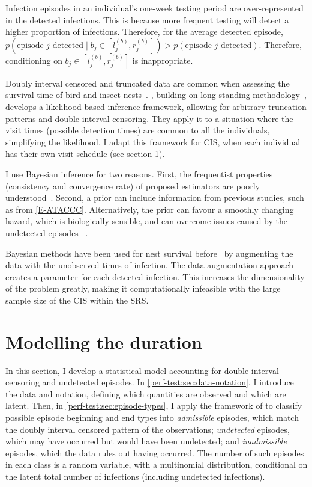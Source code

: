 \documentclass[thesis.tex]{subfiles}
\begin{document}
Infection episodes in an individual's one-week testing period are over-represented in the detected infections.
This is because more frequent testing will detect a higher proportion of infections.
Therefore, for the average detected episode, $p(\text{episode $j$ detected} \mid b_j \in [l_j^{(b)}, r_j^{(b)}]) > p(\text{episode $j$ detected})$.
Therefore, conditioning on $b_j \in [l_j^{(b)}, r_j^{(b)}]$ is inappropriate.

Doubly interval censored and truncated data are common when assessing the survival time of bird and insect nests~\autocite{heiseyABCs}.
\textcite{heiseyModelling}, building on long-standing methodology~\autocite{dempsterMaximum,turnbullEmpirical}, develops a likelihood-based inference framework, allowing for arbitrary truncation patterns and double interval censoring.
They apply it to a situation where the visit times (possible detection times) are common to all the individuals, simplifying the likelihood.
I adapt this framework for CIS, when each individual has their own visit schedule (see section \cref{perf-test:sec:model}).

I use Bayesian inference for two reasons.
First, the frequentist properties (\eg consistency and convergence rate) of proposed estimators are poorly understood~\autocite{sunAnalysis,dengNonparametric}.
Second, a prior can include information from previous studies, such as from \cref{E-ATACCC}.
Alternatively, the prior can favour a smoothly changing hazard, which is biologically sensible, and can overcome issues caused by the undetected episodes ~\autocite{caoBias}.

Bayesian methods have been used for nest survival before~\autocite{heBayesiana,heBayesian,caoModeling} by augmenting the data with the unobserved times of infection.
The data augmentation approach creates a parameter for each detected infection.
This increases the dimensionality of the problem greatly, making it computationally infeasible with the large sample size of the CIS within the SRS.


\section{Modelling the duration}\label{perf-test:sec:model}

In this section, I develop a statistical model accounting for double interval censoring and undetected episodes.
In \cref{perf-test:sec:data-notation}, I introduce the data and notation, defining which quantities are observed and which are latent.
Then, in \cref{perf-test:sec:episode-types}, I apply the framework of \textcite{heiseyModelling} to classify possible episode beginning and end types into \emph{admissible} episodes, which match the doubly interval censored pattern of the observations; \emph{undetected} episodes, which may have occurred but would have been undetected; and \emph{inadmissible} episodes, which the data rules out having occurred.
The number of such episodes in each class is a random variable, with a multinomial distribution, conditional on the latent total number of infections (including undetected infections).
\end{document}

